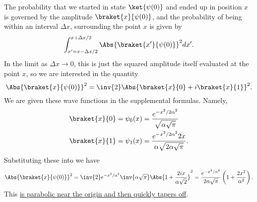 {The probability that we started in state \(\ket{\psi(0)}\) and ended up in position \(x\) is governed by the amplitude \(\braket{x}{\psi(0)}\), and the probability of being within an interval \(\Delta x\), surrounding the point \(x\) is given by
%
\begin{equation}\label{eqn:qmIexamPractice2008Dec:3:200}
\int_{x'=x-\Delta x/2}^{x+\Delta x/2} \Abs{ \braket{x'}{\psi(0)} }^2 dx'.
\end{equation}
%
In the limit as \(\Delta x \rightarrow 0\), this is just the squared amplitude itself evaluated at the point \(x\), so we are interested in the quantity
%
\begin{equation}\label{eqn:qmIexamPractice2008Dec:3:210}
\Abs{ \braket{x}{\psi(0)} }^2  = \inv{2} \Abs{ \braket{x}{0} + i \braket{x}{1} }^2.
\end{equation}
%
We are given these wave functions in the supplemental formulas.  Namely,
%
\begin{equation}\label{eqn:qmIexamPractice2008Dec:3:220}
\begin{aligned}
\braket{x}{0} &= \psi_0(x) = \frac{e^{-x^2/2\alpha^2}}{ \sqrt{\alpha \sqrt{\pi}}} \\
\braket{x}{1} &= \psi_1(x) = \frac{e^{-x^2/2\alpha^2} 2 x }{ \alpha \sqrt{2 \alpha \sqrt{\pi}}}.
\end{aligned}
\end{equation}
%
Substituting these into  we have
%
\begin{equation}\label{eqn:qmIexamPractice2008Dec:3:230}
\Abs{ \braket{x}{\psi(0)} }^2
=
\inv{2}
e^{-x^2/\alpha^2}
\inv{
\alpha \sqrt{\pi}}
\Abs{ 1 + \frac{2 i x}{\alpha \sqrt{2} } }^2
=
\frac{e^{-x^2/\alpha^2}}{ 2
\alpha \sqrt{\pi}}
\left( 1 + \frac{2 x^2}{\alpha^2 } \right).
\end{equation}
%
This \href{http://www.wolframalpha.com/input/?i=graph+e^(-x^2)+(1+\%2B+2x^2)}{is parabolic near the origin and then quickly tapers off}.

}
